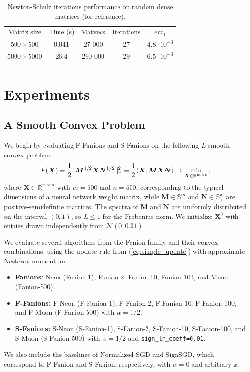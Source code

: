 \documentclass[smallextended,referee,envcountsect]{svjour3}
\def\mM{{\bm{M}}}
\def\mN{{\bm{N}}}
\def\mX{{\bm{X}}}
\newcommand{\R}{\mathbb{R}}
\newcommand{\cN}{\mathcal{N}}
\DeclarePairedDelimiter{\normf}{\|}{\|_\mathrm{F}}
\def\<#1,#2>{\langle #1,#2\rangle}
\newcommand{\Rmn}{\R^{m\times n}}
\begin{document}
 \begin{table}[ht]
 
\caption{Newton-Schulz iterations performance on random dense matrices (for reference).}\label{tbl:newton_schulz_reference}
%
     \begin{tabular}{ccccc}
       \arrayrulecolor{black}\toprule
       Matrix size    & Time (s) & Matvecs & Iterations & $err_1$ \\
       \arrayrulecolor{black}\hline
       $500 \times 500$     & 0.041    & 27 000  & 27         & $4.8 \cdot 10^{-3}$  \\
       $5000 \times 5000$   & 26.4     & 290 000 & 29         & $6.5 \cdot 10^{-3}$  \\
       \arrayrulecolor{black}\bottomrule
     \end{tabular}%
   

 \end{table}
 
 \section{Experiments}\label{sec:experiments}
 
 \subsection{A Smooth Convex Problem}
 \label{subsec:lls_exps}
 
 We begin by evaluating F-Fanions and S-Fanions on the following $L$-smooth convex problem:
 \begin{equation}\label{eq:lls}
   F(\mX) = \frac{1}{2}\normf{\mM^{1/2}\mX\mN^{1/2}}^2 = \frac{1}{2} \<\mX, \mM \mX \mN> \to \min_{\mX \in \Rmn}\,,
 \end{equation}
 where $\mX \in \Rmn$ with $m=500$ and $n=500$, corresponding to the typical dimensions of a neural network weight matrix, while $\mM \in \mathbb{S}^m_{+}$ and $\mN \in \mathbb{S}^n_{+}$ are positive-semidefinite matrices. The spectra of $\mM$ and $\mN$ are uniformly distributed on the interval $(0, 1)$, so $L \le 1$ for the Frobenius norm. We initialize $\mX^0$ with entries drawn independently from $\cN(0, 0.01)$.
 
 We evaluate several algorithms from the Fanion family and their convex combinations, using the update rule from (\ref{eq:simple_update}) with approximate Nesterov momentum:
 \begin{itemize}
   \item \textbf{Fanions:} Neon (Fanion-1), Fanion-2, Fanion-10, Fanion-100, and Muon (Fanion-500).
   \item \textbf{F-Fanions:} F-Neon (F-Fanion-1), F-Fanion-2, F-Fanion-10, F-Fanion-100, and F-Muon (F-Fanion-500) with $\alpha=1/2$.
   \item \textbf{S-Fanions:} S-Neon (S-Fanion-1), S-Fanion-2, S-Fanion-10, S-Fanion-100, and S-Muon (S-Fanion-500) with $\alpha=1/2$ and \texttt{sign\_lr\_coeff=0.01}.
 \end{itemize}
 We also include the baselines of Normalized SGD and SignSGD, which correspond to F-Fanion and S-Fanion, respectively, with $\alpha = 0$ and arbitrary $k$.
 
\end{document}
